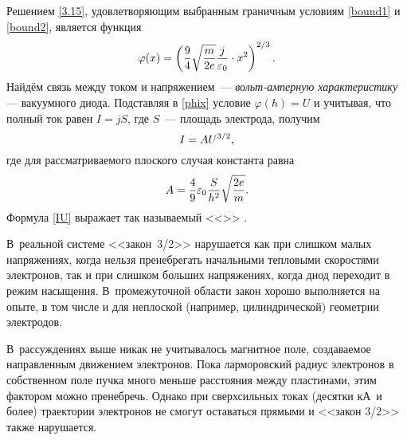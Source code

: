 Решением \eqref{3.15}, удовлетворяющим выбранным граничным условиям
\eqref{bound1} и \eqref{bound2},
является функция
\begin{equation}
\eqmark{phix}
    \varphi(x) = 
    \left(
    \frac{9}{4}\sqrt{\frac{m}{2e}}\frac{j}{\varepsilon_0} \cdot x^2
    \right)^{2/3}.
\end{equation}
Найдём связь между током и напряжением~---
\emph{вольт-амперную характеристику} --- вакуумного диода.
Подставляя в \eqref{phix} условие $\varphi(h)=U$
и учитывая, что полный ток равен $I=jS$, 
где $S$~--- площадь электрода, получим
\begin{equation}
\eqmark{IU}
    I = A U^{3/2},
\end{equation}
где для рассматриваемого плоского случая константа равна 
\begin{equation}\eqmark{IU_flat}
A=\frac{4}{9}\varepsilon_0\frac{S}{h^2}\sqrt{\frac{2e}{m}}.
\end{equation}
Формула \eqref{IU} выражает так называемый <<>> .

В~реальной системе <<закон~3/2>> нарушается как при слишком малых напряжениях, 
когда нельзя пренебрегать начальными тепловыми скоростями электронов, 
так и при слишком больших напряжениях, когда диод переходит в режим насыщения. 
В~промежуточной области закон хорошо выполняется на опыте, в том числе и для
неплоской (например, цилиндрической) геометрии электродов.

\enlargethispage{6ex} %

\begin{lab:note}
В~рассуждениях выше никак не учитывалось магнитное поле, создаваемое
направленным движением электронов. 
Пока ларморовский радиус электронов в собственном поле пучка 
много меньше расстояния между пластинами, этим фактором можно пренебречь.
Однако при сверхсильных токах (десятки кА~и более) траектории 
электронов не смогут оставаться прямыми и <<закон 3/2>> также нарушается.
\end{lab:note}


